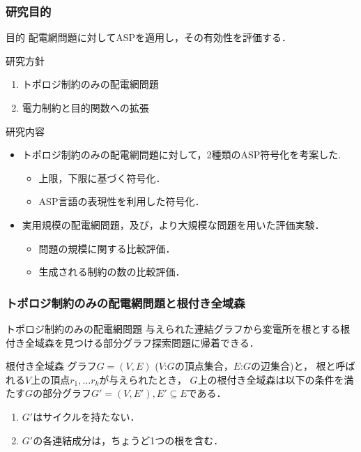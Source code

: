 \documentclass[dvipdfmx,11pt]{beamer}
\begin{document}
\begin{frame}\frametitle{研究目的}
 \begin{alertblock}{目的}
  配電網問題に対してASPを適用し，その有効性を評価する．
 \end{alertblock}

 \begin{exampleblock}{研究方針}
  \begin{enumerate}
   \item トポロジ制約のみの配電網問題
   \item 電力制約と目的関数への拡張
  \end{enumerate}
 \end{exampleblock}

 \begin{block}{研究内容}
  \begin{itemize}
   \item トポロジ制約のみの配電網問題に対して，2種類のASP符号化を考案した.
	   \begin{itemize}
		\item 上限，下限に基づく符号化．
		\item ASP言語の表現性を利用した符号化．
	   \end{itemize}
  \item 実用規模の配電網問題，及び，より大規模な問題を用いた評価実験．
	   \begin{itemize}
		\item 問題の規模に関する比較評価．
		\item 生成される制約の数の比較評価．
	   \end{itemize}
  \end{itemize}

 \end{block}

\end{frame}

\begin{frame}\frametitle{トポロジ制約のみの配電網問題と根付き全域森}
 \begin{block}{トポロジ制約のみの配電網問題}
  与えられた連結グラフから\alert{変電所を根とする根付き全域森}を見つける部分グラフ探索問題に帰着できる．
 \end{block}

 \begin{exampleblock}{根付き全域森}
  グラフ$G=(V,E)$ ($V$:$G$の頂点集合，$E$:$G$の辺集合)と，
  根と呼ばれる$V$上の頂点$ r_1, \ldots r_k $が与えられたとき，
  $G$上の根付き全域森は以下の条件を満たす$G$の部分グラフ$G'=(V,E'), E' \subseteq E$である．
  \begin{enumerate}
   \item $G'$はサイクルを持たない．
   \item $G'$の各連結成分は，ちょうど1つの根を含む．
  \end{enumerate}
 \end{exampleblock}
\end{frame}
\end{document}
